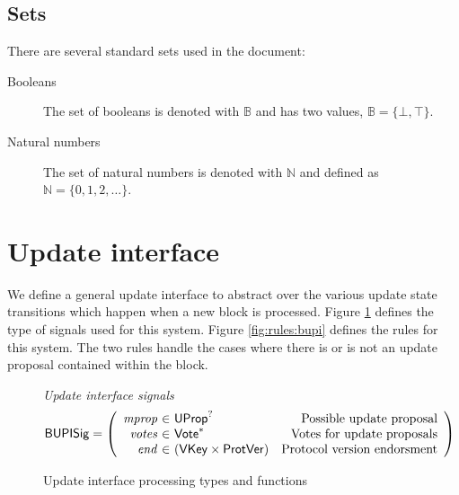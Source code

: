 \documentclass[11pt,a4paper]{article}
\newcommand{\var}[1]{\mathit{#1}}
\newcommand{\fun}[1]{\mathsf{#1}}
\newcommand{\type}[1]{\mathsf{#1}}
\newcommand{\seqof}[1]{#1^{*}}
\newcommand{\VKey}{\type{VKey}}
\begin{document}
\subsection{Sets}
\label{sec:sets}

There are several standard sets used in the document:
%
\begin{description}
\item[Booleans] The set of booleans is denoted with $\mathbb{B}$ and has two
  values, $\mathbb{B} = \{\bot, \top\}$.
\item[Natural numbers] The set of natural numbers is denoted with
  $\mathbb{N}$ and defined as $\mathbb{N} = \{0, 1, 2, \dots\}$.
\end{description}

\section{Update interface}

\newcommand{\bupdprop}[1]{\fun{bUpdProp}\ #1}
\newcommand{\bupdvotes}[1]{\fun{bUpdVotes}\ #1}
\newcommand{\bprotver}[1]{\fun{bProtVer}\ #1}
\newcommand{\bendorsment}[1]{\fun{bEndorsment}\ #1}

\newcommand{\Bupisig}{\type{BUPISig}}

\newcommand{\UPIEnv}{\type{UPIEnv}}
\newcommand{\UPIState}{\type{UPIState}}
\newcommand{\UProp}{\type{UProp}}
\newcommand{\Vote}{\ensuremath{\type{Vote}}}
\newcommand{\ProtVer}{\ensuremath{\type{ProtVer}}}

We define a general update interface to abstract over the various update state
transitions which happen when a new block is processed. Figure
\ref{fig:defs:bupi} defines the type of signals used for this system. Figure
\ref{fig:rules:bupi} defines the rules for this system. The two rules handle the
cases where there is or is not an update proposal contained within the block.

\begin{figure}[ht]
  \emph{Update interface signals}
  \begin{equation*}
    \Bupisig =
    \left(
      \begin{array}{r@{~\in~}lr}
        \var{mprop} & \UProp^{?} & \text{Possible update proposal}\\
        \var{votes} & \seqof{\Vote} & \text{Votes for update proposals}\\
        \var{end} & (\VKey \times \ProtVer) & \text{Protocol version endorsment}
      \end{array}
    \right)
  \end{equation*}

  \caption{Update interface processing types and functions}
  \label{fig:defs:bupi}
\end{figure}
\end{document}
